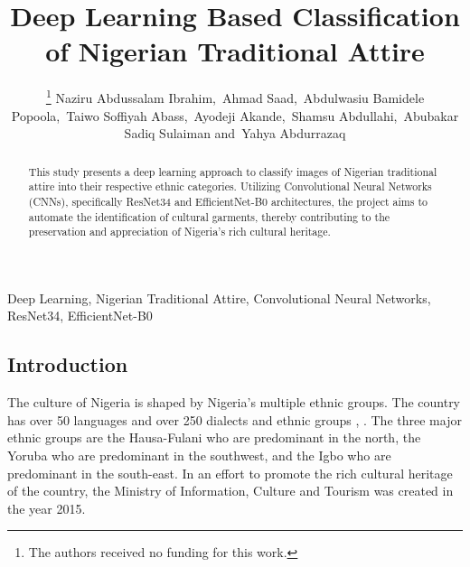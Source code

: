 \documentclass[
  journal,
]{IEEEtran}%
\title{Deep Learning Based Classification of Nigerian Traditional
Attire}
\author{
\thanks{The authors received no funding for this work.}
Naziru Abdussalam Ibrahim\orcidlink{0000-0002-1825-0097},~Ahmad
Saad\orcidlink{0000-0002-1825-0097},~Abdulwasiu Bamidele
Popoola\orcidlink{0009-0000-9742-777X},~Taiwo Soffiyah
Abass\orcidlink{0000-0002-1825-0097},~Ayodeji
Akande\orcidlink{0000-0002-1825-0097},~Shamsu
Abdullahi\orcidlink{0000-0002-1825-0097},~Abubakar Sadiq
Sulaiman\orcidlink{0000-0002-1825-0097}
and~Yahya Abdurrazaq\orcidlink{0000-0002-1825-0097}%
}
\begin{document}


\maketitle

\begin{abstract}
This study presents a deep learning approach to classify images of
Nigerian traditional attire into their respective ethnic categories.
Utilizing Convolutional Neural Networks (CNNs), specifically ResNet34
and EfficientNet-B0 architectures, the project aims to automate the
identification of cultural garments, thereby contributing to the
preservation and appreciation of Nigeria's rich cultural heritage.
\end{abstract}
\begin{IEEEkeywords}
Deep Learning, Nigerian Traditional Attire, Convolutional Neural
Networks, ResNet34, EfficientNet-B0
\end{IEEEkeywords}

%


\subsection{Introduction}\label{introduction}

The culture of Nigeria is shaped by Nigeria's multiple ethnic groups.
The country has over 50 languages and over 250 dialects and ethnic
groups ,
. The three major ethnic groups are the Hausa-Fulani who are predominant
in the north, the Yoruba who are predominant in the southwest, and the
Igbo who are predominant in the south-east. In an effort to promote the
rich cultural heritage of the country, the Ministry of Information,
Culture and Tourism was created in the year 2015.
\end{document}
